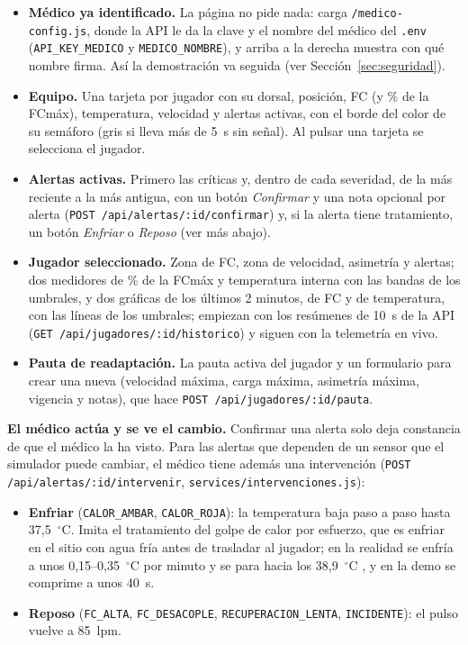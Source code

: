 \documentclass[runningheads]{llncs}
\newcommand{\ruta}[1]{\texttt{#1}}
\begin{document}
\begin{itemize}
  \item \textbf{Médico ya identificado.} La página no pide nada: carga \ruta{/medico-config.js}, donde la API le da la clave y el nombre del médico del \texttt{.env} (\texttt{API\_KEY\_MEDICO} y \texttt{MEDICO\_NOMBRE}), y arriba a la derecha muestra con qué nombre firma. Así la demostración va seguida (ver Sección~\ref{sec:seguridad}).
  \item \textbf{Equipo.} Una tarjeta por jugador con su dorsal, posición, FC (y \% de la FCmáx), temperatura, velocidad y alertas activas, con el borde del color de su semáforo (gris si lleva más de 5~s sin señal). Al pulsar una tarjeta se selecciona el jugador.
  \item \textbf{Alertas activas.} Primero las críticas y, dentro de cada severidad, de la más reciente a la más antigua, con un botón \emph{Confirmar} y una nota opcional por alerta (\texttt{POST /api/alertas/:id/confirmar}) y, si la alerta tiene tratamiento, un botón \emph{Enfriar} o \emph{Reposo} (ver más abajo).
  \item \textbf{Jugador seleccionado.} Zona de FC, zona de velocidad, asimetría y alertas; dos medidores de \% de la FCmáx y temperatura interna con las bandas de los umbrales, y dos gráficas de los últimos 2 minutos, de FC y de temperatura, con las líneas de los umbrales; empiezan con los resúmenes de 10~s de la API (\texttt{GET /api/jugadores/:id/historico}) y siguen con la telemetría en vivo.
  \item \textbf{Pauta de readaptación.} La pauta activa del jugador y un formulario para crear una nueva (velocidad máxima, carga máxima, asimetría máxima, vigencia y notas), que hace \texttt{POST /api/jugadores/:id/pauta}.
\end{itemize}

\textbf{El médico actúa y se ve el cambio.} Confirmar una alerta solo deja constancia de que el médico la ha visto. Para las alertas que dependen de un sensor que el simulador puede cambiar, el médico tiene además una intervención (\texttt{POST /api/alertas/:id/intervenir}, \ruta{services/intervenciones.js}):

\begin{itemize}
  \item \textbf{Enfriar} (\texttt{CALOR\_AMBAR}, \texttt{CALOR\_ROJA}): la temperatura baja paso a paso hasta 37,5~$^\circ$C. Imita el tratamiento del golpe de calor por esfuerzo, que es enfriar en el sitio con agua fría antes de trasladar al jugador; en la realidad se enfría a unos 0,15--0,35~$^\circ$C por minuto y se para hacia los 38,9~$^\circ$C \cite{nata2015}, y en la demo se comprime a unos 40~s.
  \item \textbf{Reposo} (\texttt{FC\_ALTA}, \texttt{FC\_DESACOPLE}, \texttt{RECUPERACION\_LENTA}, \texttt{INCIDENTE}): el pulso vuelve a 85~lpm.
\end{itemize}
\end{document}

